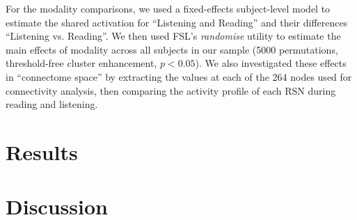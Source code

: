 For the modality comparisons, we used a fixed-effects subject-level model to estimate the shared activation for ``Listening and Reading'' and their differences ``Listening vs. Reading''. We then used FSL's \textit{randomise} utility to estimate the main effects of modality across all subjects in our sample (5000 permutations, threshold-free cluster enhancement, $p < 0.05$).  We also investigated these effects in ``connectome space'' by extracting the values at each of the 264 nodes used for connectivity analysis, then comparing the activity profile of each RSN during reading and listening.

\section{Results}

\section{Discussion}




